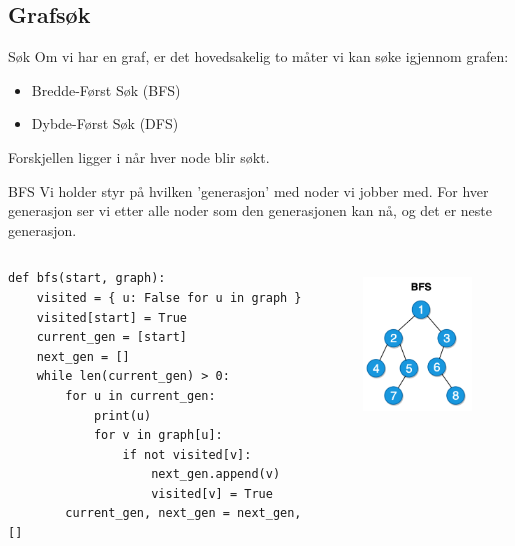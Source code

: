 \subsection{Grafsøk}
\begin{frame}{Søk}
    Om vi har en graf, er det hovedsakelig to måter vi kan søke igjennom grafen: 
    \begin{itemize}
        \item Bredde-Først Søk (BFS)
        \item Dybde-Først Søk (DFS)
    \end{itemize}
    Forskjellen ligger i når hver node blir søkt.
\end{frame}

\begin{frame}[fragile]{BFS}
    Vi holder styr på hvilken 'generasjon' med noder vi jobber med. For hver generasjon ser vi etter alle noder som den generasjonen kan nå, og det er neste generasjon.
    \begin{columns}
        \begin{column}{0.5\textwidth}
            \begin{verbatim}
def bfs(start, graph):
    visited = { u: False for u in graph }
    visited[start] = True
    current_gen = [start]
    next_gen = []
    while len(current_gen) > 0:
        for u in current_gen:
            print(u)
            for v in graph[u]:
                if not visited[v]:
                    next_gen.append(v)
                    visited[v] = True
        current_gen, next_gen = next_gen, []
            \end{verbatim}
        \end{column}
        \begin{column}{0.45\textwidth}
            \begin{figure}
                \centering
                \includegraphics[height=4cm]{images/bfs.png}
                \label{fig:bfs}
            \end{figure}   
        \end{column}
    \end{columns}
\end{frame}

